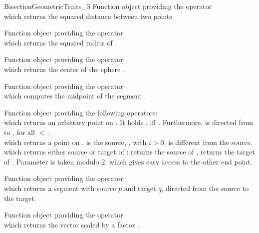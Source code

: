 \begin{ccRefConcept}{BisectionGeometricTraits_3}
{Function object providing the operator\\
 which returns the squared distance
between two points.}

{Function object providing the operator\\
 which returns the squared radius
of~.}

{Function object providing the operator\\
 which returns the center of
the sphere~.}

{Function object providing the operator\\
 which computes
the midpoint of the segment .}

{Function object providing the following operators:\\
   which returns an
  arbitrary point on . It holds , iff
  . Furthermore, is directed from  to
  , for all  $<$ .\\
   which returns a point on
  .  is the source, , with
  $i>0$, is different from the source. \\
   which returns either source
  or target of :  returns the source of ,
   returns the target of . Parameter
   is taken modulo 2, which gives easy access to the other end
  point.
}

{Function object providing the operator\\
   which
  returns a segment with source $p$ and target $q$, directed from the
  source to the target.}

{Function object providing the operator\\
 which returns
the vector  scaled by a factor .}


\end{ccRefConcept}
